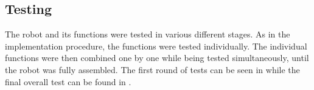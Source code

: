 \subsection{Testing}
The robot and its functions were tested in various different stages. As in the implementation procedure, the functions were tested individually. The individual functions were then combined one by one while being tested simultaneously, until the robot was fully assembled. The first round of tests can be seen in  while the final overall test can be found in . 




